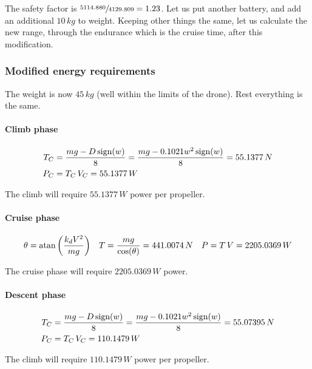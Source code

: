 The safety factor is $\sfrac{5114.880}{4129.809} = 1.23$. 
Let us put another battery, and add an additional $10\,kg$ to weight. Keeping other things the same, let us calculate the new range, through the endurance which is the cruise time, after this modification.

\subsubsection*{Modified energy requirements}

The weight is now $45\,kg$ (well within the limits of the drone). Rest everything is the same.

\paragraph*{Climb phase}

\begin{align*}
    T_C &= \frac{mg - D\,\textup{sign}(w)}{8} = \frac{mg - 0.1021 w^2\,\textup{sign}(w)}{8} = 55.1377 \,N \\
    P_C &= T_C \, V_C = 55.1377 \, W
\end{align*}

The climb will require $55.1377 \, W$ power per propeller.

\paragraph*{Cruise phase}

\begin{align*}
    \theta = \textup{atan}\left(\frac{k_d V^2}{mg}\right) &&
    T = \frac{mg}{\cos(\theta)} = 441.0074 \, N &&
    P = T\, V = 2205.0369 \,W
\end{align*}

The cruise phase will require $2205.0369 \, W$ power.

\paragraph*{Descent phase}

\begin{align*}
    T_C &= \frac{mg - D\,\textup{sign}(w)}{8} = \frac{mg - 0.1021 w^2\,\textup{sign}(w)}{8} = 55.07395 \,N \\
    P_C &= T_C \, V_C = 110.1479 \, W
\end{align*}

The climb will require $110.1479 \, W$ power per propeller.

